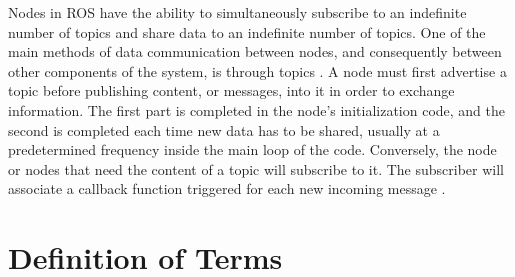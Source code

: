 Nodes in ROS have the ability to simultaneously subscribe to an indefinite number of topics and share data to an indefinite number of topics. One of the main methods of data communication between nodes, and consequently between other components of the system, is through topics \citep{St-Onge2022}. A node must first advertise a topic before publishing content, or messages, into it in order to exchange information. The first part is completed in the node's initialization code, and the second is completed each time new data has to be shared, usually at a predetermined frequency inside the main loop of the code. Conversely, the node or nodes that need the content of a topic will subscribe to it. The subscriber will associate a callback function triggered for each new incoming message \citep{St-Onge2022}.




\section{Definition of Terms}
\label{intro:sec:Definition of Terms}

